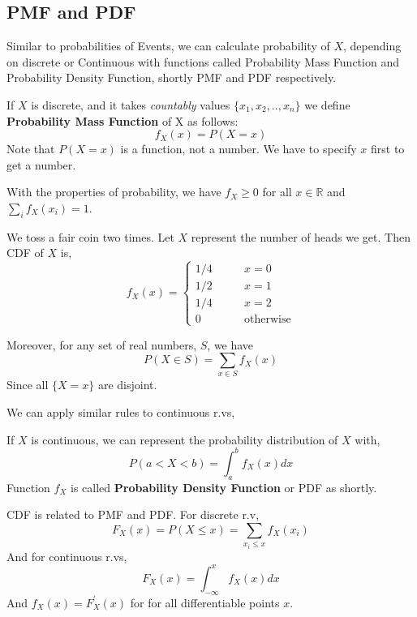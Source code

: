 \subsection*{PMF and PDF}
Similar to probabilities of Events, we can calculate probability of $X$, depending on discrete or Continuous with functions called
\alert{Probability Mass Function} and \alert{Probability Density Function}, shortly PMF and PDF respectively.
\begin{definition}
    If $X$ is discrete, and it takes \textit{countably} values $ \{ x_1,x_2,..,
    x_n \}$ we define \textbf{Probability Mass Function} of X as follows:
    $$f_X(x)= P(X = x)$$
    Note that $P(X = x)$ is a function, not a number. We have to specify $x$ first to get a number.
\end{definition}

With the properties of probability, we have $f_X \ge 0$ for all $x \in \mathbb{R}$ and $\sum_{i} f_X (x_i) =1 $.

\begin{example}
    We toss a fair coin two times. Let $X$ represent the number of heads we get. Then CDF of $X$ is,
    \[f_X(x) =
        \begin{cases}
            1/4 \qquad &x=0\\
            1/2 \qquad &x=1 \\
            1/4 \qquad &x=2\\
            0 \qquad &\text{otherwise}
        \end{cases}
    \]
\end{example}

Moreover, for any set of real numbers, $S$, we have
\[ P (X \in S) = \sum_{x \in S} f_X(x)\]
Since all $\{X = x \}$  are disjoint.\\
\par
We can apply similar rules to continuous r.vs,
\begin{definition}
    If $X$ is continuous, we can represent the probability distribution of $X$ with,
    \[ P(a < X < b) = \int_{a}^{b} f_X(x) dx \]
    Function  $f_X$ is called \textbf{Probability Density Function} or PDF as shortly.
\end{definition}

\begin{definition}
    CDF is related to PMF and PDF. For discrete r.v,
    \[F_X(x) = P(X \le x) = \sum_{x_i \le x} f_X(x_i)\]
    And for continuous r.vs,
    \[F_X(x)= \int_{-\infty}^x f_X(x)dx \]
    And $f_X(x) = F_X^{'}(x)$ for for all differentiable points $x$.\\
\end{definition}


